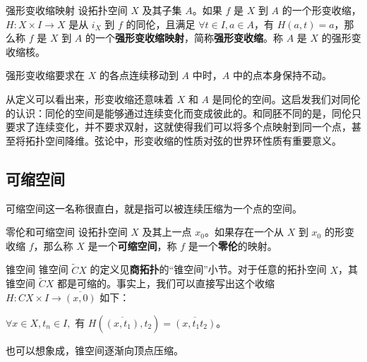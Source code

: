 \begin{definition}{强形变收缩映射}\label{def_HomT2_1}
设拓扑空间 $X$ 及其子集 $A$。如果 $f$ 是 $X$ 到 $A$ 的一个形变收缩，$H:X\times I\rightarrow X$ 是从 $i_X$ 到 $f$ 的同伦，且满足 $\forall t\in I, a\in A$，有 $H(a, t)=a$，那么称 $f$ 是 $X$ 到 $A$ 的一个\textbf{强形变收缩映射}，简称\textbf{强形变收缩}。称 $A$ 是 $X$ 的强形变收缩核。
\end{definition}

强形变收缩要求在 $X$ 的各点连续移动到 $A$ 中时，$A$ 中的点本身保持不动。

从定义可以看出来，形变收缩还意味着 $X$ 和 $A$ 是同伦的空间。这启发我们对同伦的认识：同伦的空间是能够通过连续变化而变成彼此的。和同胚不同的是，同伦只要求了连续变化，并不要求双射，这就使得我们可以将多个点映射到同一个点，甚至将拓扑空间降维。弦论中，形变收缩的性质对弦的世界环性质有重要意义。

\subsection{可缩空间}
可缩空间这一名称很直白，就是指可以被连续压缩为一个点的空间。

\begin{definition}{零伦和可缩空间}
设拓扑空间 $X$ 及其上一点 $x_0$。如果存在一个从 $X$ 到 $x_0$ 的形变收缩 $f$，那么称 $X$ 是一个\textbf{可缩空间}，称 $f$ 是一个\textbf{零伦}的映射。
\end{definition}

\begin{example}{锥空间}
锥空间 $\widetilde{C}X$ 的定义见\textbf{商拓扑}的“锥空间”小节。对于任意的拓扑空间 $X$，其锥空间 $\widetilde{C}X$ 都是可缩的。事实上，我们可以直接写出这个收缩 $H:CX\times I\rightarrow\overline{(x, 0)}$ 如下：

$\forall x\in X, t_n\in I, $ 有 $H(\overline{(x, t_1)}, t_2)=\overline{(x, t_1t_2)}$。

也可以想象成，锥空间逐渐向顶点压缩。
\end{example}


